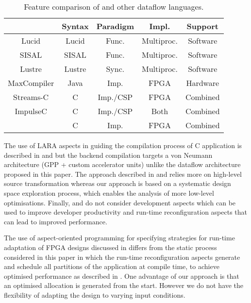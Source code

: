 \begin{table}[!h]
  \renewcommand{\arraystretch}{1.2}
  \centering
  \caption{Feature comparison of \MAXC{} and other dataflow languages.}
  \label{table:feature-comparison}
  \begin{tabular}{ c |  c |  c |  c |  c }
    \hline
    \           & \bf{Syntax} & \bf{Paradigm} & \bf{Impl.} & \bf{Support} \\
    \hline \hline
    Lucid       & Lucid       & Func.         & Multiproc. & Software     \\
    SISAL       & SISAL       & Func.         & Multiproc. & Software     \\
    Lustre      & Lustre      & Sync.         & Multiproc. & Software     \\
    MaxCompiler & Java        & Imp.          & FPGA       & Hardware     \\
    Streams-C   & C           & Imp./CSP      & FPGA       & Combined     \\
    ImpulseC    & C           & Imp./CSP      & Both       & Combined     \\
    \MAXC{}     & C           & Imp.          & FPGA       & Combined     \\
  \end{tabular}
\end{table}

The use of LARA aspects in guiding the compilation process of C
application is described in
\cite{Cardoso:Teixeira:Alves:Nobre:Diniz:Cutinho:Luk:2012} and
\cite{cardoso2011new} but the backend compilation targets a von
Neumann architecture (GPP + custom accelerator units) unlike the
dataflow architecture proposed in this paper. The approach described
in \cite{Cardoso:Teixeira:Alves:Nobre:Diniz:Cutinho:Luk:2012} and
\cite{cardoso2011new} relies more on high-level source transformation
whereas our approach is based on a systematic design space
exploration process, which enables the analysis of more low-level
optimisations. Finally,
\cite{Cardoso:Teixeira:Alves:Nobre:Diniz:Cutinho:Luk:2012} and
\cite{cardoso2011new} do not consider development aspects which can be
used to improve developer productivity and run-time reconfiguration
aspects that can lead to improved performance.

The use of aspect-oriented programming for specifying strategies for
run-time adaptation of FPGA designs discussed in \cite{6322875}
differs from the static process considered in this paper in which the
run-time reconfiguration aspects generate and schedule all partitions
of the application at compile time, to achieve optimised performance as
described in \cite{Xinyu:Qiwei:Luk:Qiang:Pell:2012}. One advantage of
our approach is that an optimised allocation is generated from the
start. However we do not have the flexibility of adapting the design
to varying input conditions.
